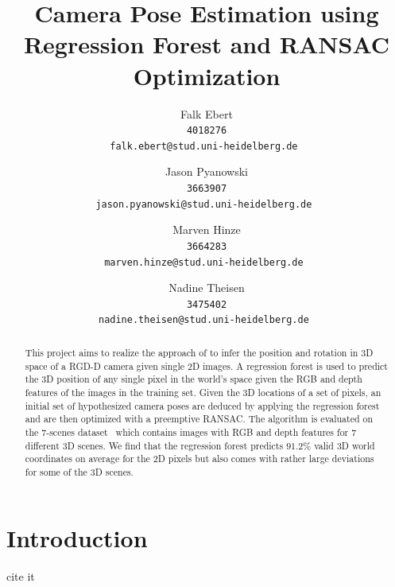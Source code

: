 \documentclass[final]{cvpr}
\begin{document}
\title{Camera Pose Estimation using Regression Forest and RANSAC Optimization}

\author{Falk Ebert\\
\tt 4018276\\
{\tt\small falk.ebert@stud.uni-heidelberg.de}
\and
Jason Pyanowski\\
\tt 3663907\\
{\tt\small jason.pyanowski@stud.uni-heidelberg.de}
\and
Marven Hinze\\
\tt 3664283\\
{\tt\small marven.hinze@stud.uni-heidelberg.de}
\and
Nadine Theisen\\
\tt 3475402\\
{\tt\small nadine.theisen@stud.uni-heidelberg.de}
}

\maketitle


\begin{abstract}
This project aims to realize the approach of \cite{shotton2013} to infer the position and rotation in 3D space of a RGD-D camera given single 2D images. A regression forest is used to predict the 3D position of any single pixel in the world's space given the RGB and depth features of the images in the training set. Given the 3D locations of a set of pixels, an initial set of hypothesized camera poses are deduced by applying the regression forest and are then optimized with a preemptive RANSAC. The algorithm is evaluated on the 7-scenes dataset~\cite{glocker2013} which contains images with RGB and depth features for 7 different 3D scenes. We find that the regression forest predicts $91.2\%$ valid 3D world coordinates on average for the 2D pixels but also comes with rather large deviations for some of the 3D scenes. %

   
\end{abstract}

\section{Introduction}
cite it~\cite{shotton2013}
\end{document}
